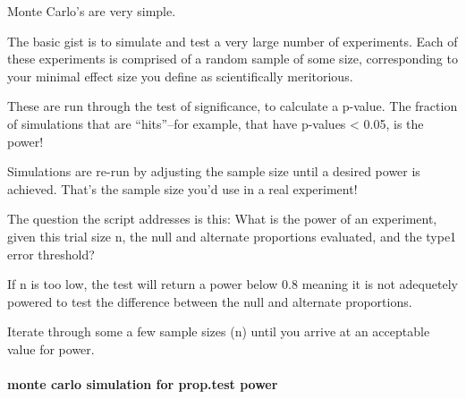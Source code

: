 \documentclass[]{book}
\let\oldparagraph\paragraph
\renewcommand{\paragraph}[1]{\oldparagraph{#1}\mbox{}}
\begin{document}
Monte Carlo's are very simple.

The basic gist is to simulate and test a very large number of experiments. Each of these experiments is comprised of a random sample of some size, corresponding to your minimal effect size you define as scientifically meritorious.

These are run through the test of significance, to calculate a p-value. The fraction of simulations that are ``hits''--for example, that have p-values \textless{} 0.05, is the power!

Simulations are re-run by adjusting the sample size until a desired power is achieved. That's the sample size you'd use in a real experiment!

The question the script addresses is this: What is the power of an experiment, given this trial size n, the null and alternate proportions evaluated, and the type1 error threshold?

If n is too low, the test will return a power below 0.8 meaning it is not adequetely powered to test the difference between the null and alternate proportions.

Iterate through some a few sample sizes (n) until you arrive at an acceptable value for power.

\hypertarget{monte-carlo-simulation-for-prop.test-power}{%
\paragraph{monte carlo simulation for prop.test power}\label{monte-carlo-simulation-for-prop.test-power}}
\end{document}
